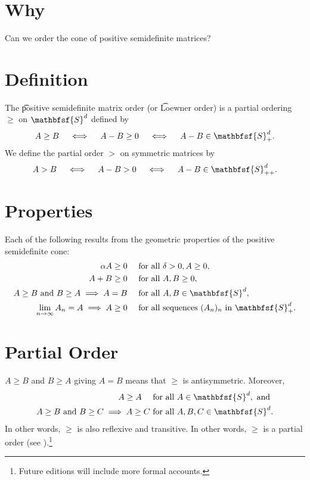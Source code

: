 

\section*{Why}

Can we order the cone of positive semidefinite matrices?

\section*{Definition}

The \t{positive semidefinite matrix order} (or \t{Loewner order}) is a partial ordering $\geq$ on $\mathbfsf{S} ^d$ defined by
\[
A \geq B \quad \iff \quad A - B \geq 0 \quad \iff \quad A - B \in \mathbfsf{S} _+^d.
\]
We define the partial order $>$ on symmetric matrices by
\[
A > B \quad \iff \quad A - B > 0 \quad \iff \quad A - B \in \mathbfsf{S} _{++}^d.
\]

\section*{Properties}

Each of the following results from the geometric properties of the positive semidefinite cone:
\[
\begin{aligned}
\alpha  A \geq 0 \quad & \text{ for all } \delta  > 0, A \geq 0, \\
A + B \geq 0 \quad & \text{ for all } A, B \geq 0, \\
A \geq B \text{ and } B \geq A \implies A = B \quad & \text{ for all } A, B \in \mathbfsf{S} ^d, \\
\lim_{n \to \infty} A_n = A \implies A \geq 0 \quad & \text{ for all sequences } (A_n)_n \text{ in } \mathbfsf{S} _+^d.
\end{aligned}
\]

\section*{Partial Order}

$A \geq B$ and $B \geq A$ giving $A = B$ means that $\geq$ is antisymmetric.
Moreover,
\[
\begin{aligned}
A \geq A \quad & \text{ for all } A \in \mathbfsf{S} ^d, \text{ and } \\
A \geq B \text{ and } B \geq C \implies A \geq C & \text { for all } A, B, C \in \mathbfsf{S} ^d.
\end{aligned}
\]
In other words, $\geq$ is also reflexive and transitive.
In other words, $\geq$ is a partial order (see ).\footnote{Future editions will include more formal accounts.}

